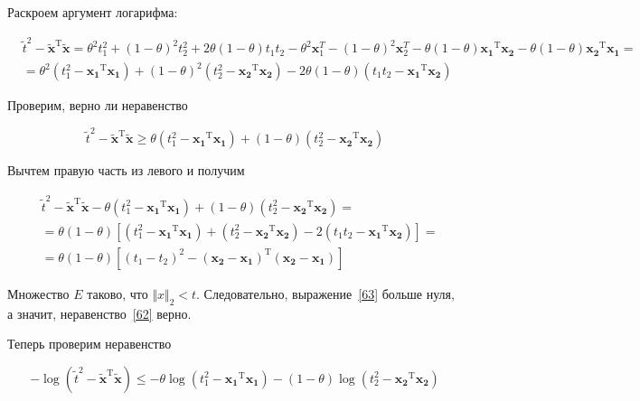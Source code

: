 	Раскроем аргумент логарифма:
	
	\begin{equation}
	\begin{split}
	&\tilde{t}^2 - \mathbf{\tilde{x}}^\text{T} \mathbf{\tilde{x}} = \theta^2 t_1^2 + (1-\theta)^2 t_2^2 + 2\theta(1-\theta)t_1 t_2 - \theta^2 \mathbf{x}_1^{T} -(1- \theta)^2 \mathbf{x}_2^{T} - \theta (1- \theta)\mathbf{x_1}^\text{T} \mathbf{x_2} - \theta (1- \theta)\mathbf{x_2}^\text{T} \mathbf{x_1} = \\
	&=\theta^2(t_1^2 - \mathbf{x_1}^\text{T} \mathbf{x_1}) + (1-\theta)^2(t_2^2 - \mathbf{x_2}^\text{T} \mathbf{x_2}) - 2\theta (1-\theta)(t_1 t_2 - \mathbf{x_1}^\text{T} \mathbf{x_2})
	\end{split}
	\end{equation}
	
	Проверим, верно ли неравенство
	
	\begin{equation}
	\label{62}
	\tilde{t}^2 - \mathbf{\tilde{x}}^\text{T} \mathbf{\tilde{x}} \geqslant \theta (t_1^2 - \mathbf{x_1}^\text{T} \mathbf{x_1}) + (1-\theta)(t_2^2 - \mathbf{x_2}^\text{T} \mathbf{x_2})
	\end{equation}
	
	Вычтем правую часть из левого и получим
	
	
	
	\begin{equation}
	\begin{split}
	\label{63}
	&\tilde{t}^2 - \mathbf{\tilde{x}}^\text{T} \mathbf{\tilde{x}} - \theta (t_1^2 - \mathbf{x_1}^\text{T} \mathbf{x_1}) + (1-\theta)(t_2^2 - \mathbf{x_2}^\text{T} \mathbf{x_2}) = \\
	&= \theta(1-\theta) \left[ (t_1^2 - \mathbf{x_1}^\text{T} \mathbf{x_1}) + (t_2^2 - \mathbf{x_2}^\text{T} \mathbf{x_2}) - 2(t_1 t_2 - \mathbf{x_1}^\text{T} \mathbf{x_2})\right] = \\
	&=\theta(1-\theta) \left[ (t_1-t_2)^2 - (\mathbf{x_2} - \mathbf{x_1})^\text{T}(\mathbf{x_2} - \mathbf{x_1})\right] 
	\end{split}
	\end{equation}
	
	Множество $E$ таково, что $\Vert x \Vert_2 < t$. Следовательно, выражение~\eqref{63} больше нуля, а значит, неравенство~\eqref{62} верно.
	
	Теперь проверим неравенство
	
	\begin{equation}
	\label{64}
	-\log(\tilde{t}^2 - \mathbf{\tilde{x}}^\text{T} \mathbf{\tilde{x}}) \leqslant - \theta \log(t_1^2 - \mathbf{x_1}^\text{T} \mathbf{x_1}) - (1-\theta) \log(t_2^2 - \mathbf{x_2}^\text{T} \mathbf{x_2})
	\end{equation}
	
